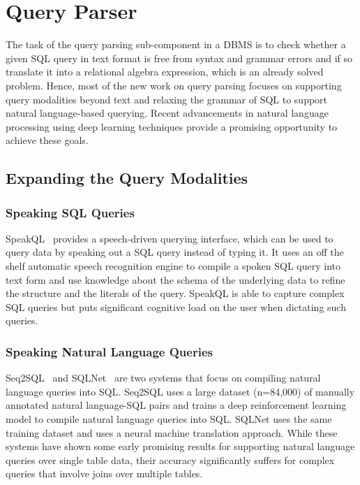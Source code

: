 \section{Query Parser}
The task of the query parsing sub-component in a DBMS is to check whether a given SQL query in text format is free from syntax and grammar errors and if so translate it into a relational algebra expression, which is an already solved problem.
Hence, most of the new work on query parsing focuses on supporting query modalities beyond text and relaxing the grammar of SQL to support natural language-based querying.
Recent advancements in natural language processing using deep learning techniques provide a promising opportunity to achieve these goals.

\subsection{Expanding the Query Modalities}
\subsubsection{Speaking SQL Queries}
SpeakQL~\cite{speakql} provides a speech-driven querying interface, which can be used to query data by speaking out a SQL query instead of typing it.
It uses an off the shelf automatic speech recognition engine to compile a spoken SQL query into text form and use knowledge about the schema of the underlying data to refine the structure and the literals of the query.
SpeakQL is able to capture complex SQL queries but puts significant cognitive load on the user when dictating such queries.

\subsubsection{Speaking Natural Language Queries}
Seq2SQL~\cite{seq2sql} and SQLNet~\cite{sqlnet} are two systems that focus on compiling natural language queries into SQL.
Seq2SQL uses a large dataset (n=84,000) of manually annotated natural language-SQL pairs and trains a deep reinforcement learning model to compile natural language queries into SQL.
SQLNet uses the same training dataset and uses a neural machine translation approach.
While these systems have shown some early promising results for supporting natural language queries over single table data, their accuracy significantly suffers for complex queries that involve joins over multiple tables.